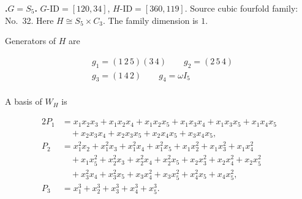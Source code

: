 \documentclass[12pt]{amsart}
\numberwithin{equation}{section}
\theoremstyle{plain}
\theoremstyle{definition}
\theoremstyle{remark}
\newenvironment{familydisplay}{%
  \begingroup
  \setlength{\arraycolsep}{1.35pt}%
  \renewcommand{\arraystretch}{0.96}%
  \setlength{\jot}{2pt}%
}{\endgroup}
\begin{document}
\par{}\medskip\noindent\textbf{.\enspace $G=S_5$.}\label{fam:threefold-no-8}
$G\text{-ID}=[120,34]$, $H\text{-ID}=[360,119]$.
Source cubic fourfold family: No.~32.  Here
$H\cong S_5\times C_3$.
The family dimension is $1$.
\par\smallskip\noindent Generators of $H$ are\par\nopagebreak
\begin{familydisplay}
\begin{align*}
&g_{1}=(1\,2\,5)(3\,4)\qquad g_{2}=(2\,5\,4)\\
&g_{3}=(1\,4\,2)\qquad g_{4}=\omega I_5\\
\end{align*}
\end{familydisplay}
\par\smallskip\noindent A basis of $W_H$ is\par\nopagebreak
\begin{familydisplay}
\begin{alignat*}{2}
P_{1}&=x_{1}x_{2}x_{3}+x_{1}x_{2}x_{4}+x_{1}x_{2}x_{5}+x_{1}x_{3}x_{4}+x_{1}x_{3}x_{5}+x_{1}x_{4}x_{5}\\
&\quad +x_{2}x_{3}x_{4}+x_{2}x_{3}x_{5}+x_{2}x_{4}x_{5}+x_{3}x_{4}x_{5},\\[2pt]
P_{2}&=x_{1}^{2}x_{2}+x_{1}^{2}x_{3}+x_{1}^{2}x_{4}+x_{1}^{2}x_{5}+x_{1}x_{2}^{2}+x_{1}x_{3}^{2}+x_{1}x_{4}^{2}\\
&\quad +x_{1}x_{5}^{2}+x_{2}^{2}x_{3}+x_{2}^{2}x_{4}+x_{2}^{2}x_{5}+x_{2}x_{3}^{2}+x_{2}x_{4}^{2}+x_{2}x_{5}^{2}\\
&\quad +x_{3}^{2}x_{4}+x_{3}^{2}x_{5}+x_{3}x_{4}^{2}+x_{3}x_{5}^{2}+x_{4}^{2}x_{5}+x_{4}x_{5}^{2},\\[2pt]
P_{3}&=x_{1}^{3}+x_{2}^{3}+x_{3}^{3}+x_{4}^{3}+x_{5}^{3}.\\[2pt]
\end{alignat*}
\end{familydisplay}
\end{document}
